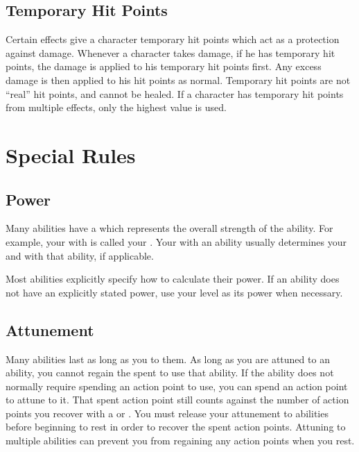     \subsection{Temporary Hit Points}\label{Temporary Hit Points}
        Certain effects give a character temporary hit points which act as a protection against damage.
        Whenever a character takes damage, if he has temporary hit points, the damage is applied to his temporary hit points first.
        Any excess damage is then applied to his hit points as normal.
        Temporary hit points are not ``real'' hit points, and cannot be healed.
        If a character has temporary hit points from multiple effects, only the highest value is used.

\section{Special Rules}

    \subsection{Power}\label{Power}
        Many abilities have a  which represents the overall strength of the ability.
        For example, your  with  is called your .
        Your  with an ability usually determines your  and  with that ability, if applicable.

        Most abilities explicitly specify how to calculate their power.
        If an ability does not have an explicitly stated power, use your level as its power when necessary.

    \subsection{Attunement}\label{Attunement}
        Many abilities last as long as you  to them.
        As long as you are attuned to an ability, you cannot regain the  spent to use that ability.
        If the ability does not normally require spending an action point to use, you can spend an action point to attune to it.
        That spent action point still counts against the number of action points you recover with a  or .
        You must release your attunement to abilities before beginning to rest in order to recover the spent action points.
        Attuning to multiple abilities can prevent you from regaining any action points when you rest.

